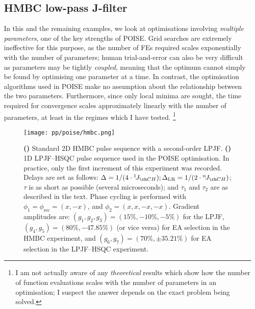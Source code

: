 \subsection{HMBC low-pass J-filter}
\label{subsec:poise__hmbc}

In this and the remaining examples, we look at optimisations involving \textit{multiple parameters}, one of the key strengths of POISE.
Grid searches are extremely ineffective for this purpose, as the number of FEs required scales exponentially with the number of parameters; human trial-and-error can also be very difficult as parameters may be tightly \textit{coupled}, meaning that the optimum cannot simply be found by optimising one parameter at a time.
In contrast, the optimisation algorithms used in POISE make no assumption about the relationship between the two parameters.
Furthermore, since only local minima are sought, the time required for convergence scales approximately linearly with the number of parameters, at least in the regimes which I have tested.%
\footnote{I am not actually aware of any \textit{theoretical} results which show how the number of function evaluations scales with the number of parameters in an optimisation; I suspect the answer depends on the exact problem being solved.}

\begin{figure}[htb]
    \centering
    \texttt{[image: pp/poise/hmbc.png]}%
    {\label{fig:poise_hmbc_pulseq_hmbc}}%
    {\label{fig:poise_hmbc_pulseq_hsqc}}%
    \caption[Pulse sequences used for HMBC optimisation]{
        \textbf{()} Standard 2D HMBC pulse sequence with a second-order LPJF.
        \textbf{()} 1D LPJF--HSQC pulse sequence used in the POISE optimisation.
        In practice, only the first increment of this experiment was recorded.
        Delays are set as follows: $\Delta = 1 / (4 \cdot \oneJ{CH}); \Delta_\text{LR} = 1 / (2 \cdot \nJ{CH})$; $\tau$ is as short as possible (several microseconds); and $\tau_1$ and $\tau_2$ are as described in the text.
        Phase cycling is performed with $\phi_1 = \phi_\text{rec} = (x, -x)$, and $\phi_2 = (x, x, -x, -x)$.
        Gradient amplitudes are: $(g_1, g_2, g_3) = (15\%, -10\%, -5\%)$ for the LPJF, $(g_4, g_5) = (80\%, -47.85\%)$ (or vice versa) for EA selection in the HMBC experiment\autocite{Cicero2001JMR}, and $(g_6, g_7) = (70\%, \pm 35.21\%)$ for EA selection in the LPJF--HSQC experiment.
    }
    \label{fig:poise_hmbc_pulseq}
\end{figure}

